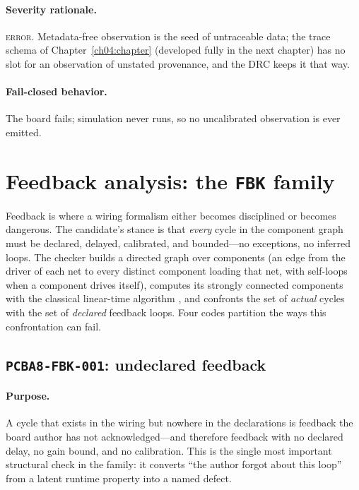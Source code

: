 \paragraph{Severity rationale.} \textsc{error}. Metadata-free observation is the seed of untraceable data; the trace schema of Chapter~\ref{ch04:chapter} (developed fully in the next chapter) has no slot for an observation of unstated provenance, and the DRC keeps it that way.

\paragraph{Fail-closed behavior.} The board fails; simulation never runs, so no uncalibrated observation is ever emitted.

\section{Feedback analysis: the \texttt{FBK} family}\label{ch07:sec:fbk}

Feedback is where a wiring formalism either becomes disciplined or becomes dangerous. The candidate's stance is that \emph{every} cycle in the component graph must be declared, delayed, calibrated, and bounded---no exceptions, no inferred loops. The checker builds a directed graph over components (an edge from the driver of each net to every distinct component loading that net, with self-loops when a component drives itself), computes its strongly connected components with the classical linear-time algorithm \cite{tarjan}, and confronts the set of \emph{actual} cycles with the set of \emph{declared} feedback loops. Four codes partition the ways this confrontation can fail.

\subsection{\texttt{PCBA8-FBK-001}: undeclared feedback}\label{ch07:sub:fbk001}

\paragraph{Purpose.} A cycle that exists in the wiring but nowhere in the declarations is feedback the board author has not acknowledged---and therefore feedback with no declared delay, no gain bound, and no calibration. This is the single most important structural check in the family: it converts ``the author forgot about this loop'' from a latent runtime property into a named defect.

